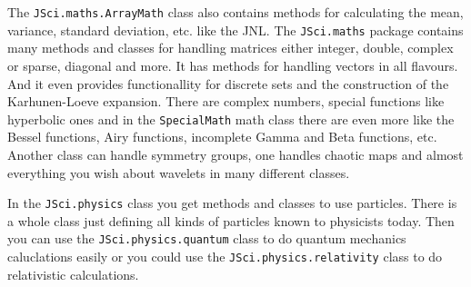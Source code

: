 The \verb|JSci.maths.ArrayMath| class also contains methods for
calculating the mean, variance, standard deviation, etc. like
the JNL. The \verb|JSci.maths| package  
contains many methods and classes for handling matrices
either integer, double, complex or sparse, diagonal and more. It has methods
for handling vectors in all flavours. And it even provides functionallity
for discrete sets and the construction of the Karhunen-Loeve expansion. 
There are complex numbers, special functions like hyperbolic ones
and in the \verb|SpecialMath| math class there are even more like
the Bessel functions, Airy functions, incomplete Gamma and Beta functions, etc.
Another class can handle symmetry groups, one handles chaotic maps and
almost everything you wish about wavelets in many different classes.

In the \verb|JSci.physics| class you get methods and classes to use
particles. There is a whole class just defining all kinds of particles
known to physicists today. Then you can use the \verb|JSci.physics.quantum|
class to do quantum mechanics caluclations easily or you could use
the \verb|JSci.physics.relativity| class to do relativistic calculations.

